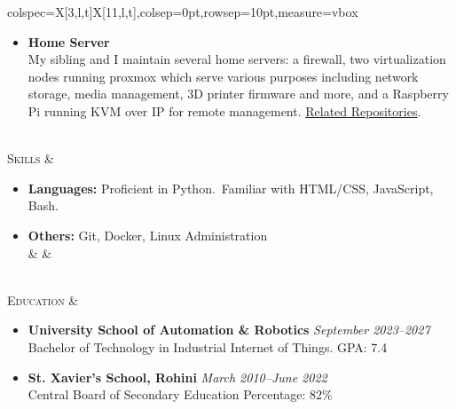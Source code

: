\documentclass[11pt]{article}
\begin{document}
\begin{tblr}{colspec={X[3,l,t]X[11,l,t]},colsep=0pt,rowsep=10pt,measure=vbox}
\begin{itemize}[label=\diamond,topsep=0pt,leftmargin=2pt]
            \item \textbf{Home Server}\\
            My sibling and I maintain several home servers: a firewall, two virtualization nodes running proxmox which
            serve various purposes including network storage, media management, 3D printer firmware and more, and a
            Raspberry Pi running KVM over IP for remote management.
            \href{https://github.com/xserv-labs}{\color{blue}Related Repositories}.\
        \end{itemize}
        \\
        \textsc{\Large Skills} &
        \vspace*{-1.5\topsep}
        \begin{itemize}[label=\diamond,topsep=0pt,leftmargin=2pt]
            \item \textbf{Languages:} Proficient in Python.\ Familiar with HTML/CSS, JavaScript, Bash.
            \item \textbf{Others:} Git, Docker, Linux Administration \\ & &
        \end{itemize}
        \\
        \textsc{\Large Education} &
        \vspace*{-1.5\topsep}
        \begin{itemize}[label=\diamond,topsep=0pt,leftmargin=2pt]
            \item \textbf{University School of Automation \& Robotics} \hfill \textit{September 2023--2027} \\
            Bachelor of Technology in Industrial Internet of Things. \hfill GPA: 7.4
            \item \textbf{St. Xavier's School, Rohini} \hfill \textit{March 2010--June 2022} \\
            Central Board of Secondary Education \hfill Percentage: $82\%$
        \end{itemize}
    \end{tblr}
\end{document}
